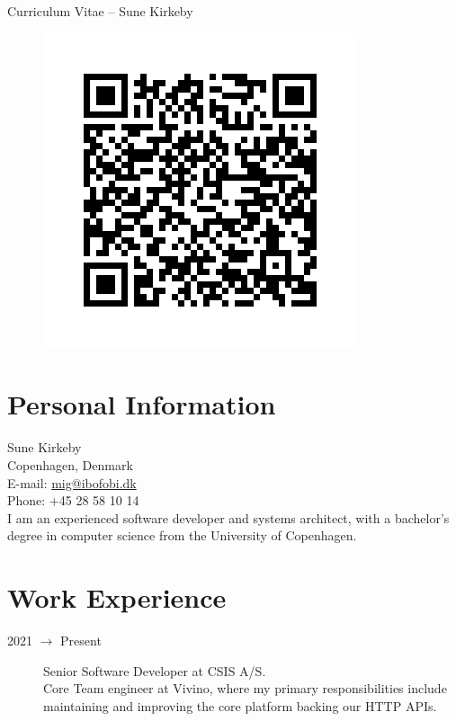 \documentclass[margin,line,a4paper]{resume}
\begin{document}
{\sc \Large Curriculum Vitae -- Sune Kirkeby}
\begin{resume}

\begin{figure}
\vspace{-1.3cm}
\begin{center}
\includegraphics[scale=0.2,bb=0 0 350 350]{qr.png}
\end{center}
\vspace{-1cm}
\end{figure}

\section{\mysidestyle Personal Information}\vspace{1mm}
Sune Kirkeby \\
Copenhagen, Denmark \\
E-mail: \href{mailto:mig@ibofobi.dk}{mig@ibofobi.dk} \\
Phone: +45 28 58 10 14 \\

I am an experienced software developer and systems architect, with a
bachelor's degree in computer science from the University of Copenhagen.


\section{\mysidestyle Work Experience}\vspace{1mm}
\begin{description}
\item[2021 $\rightarrow$ Present] Senior Software Developer at CSIS A/S. \\
Core Team engineer at Vivino, where my primary responsibilities include
maintaining and improving the core platform backing our HTTP APIs.


\end{description}
\end{resume}
\end{document}
